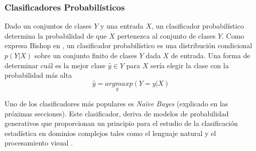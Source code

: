 \subsubsection{Clasificadores Probabilísticos}

	Dado un conjuntos de clases $Y$ y una entrada $X$, un clasificador probabilístico determina la probabilidad de que $X$ pertenezca al conjunto de clases $Y$. Como expresa Bishop en \cite{Bis07}, un clasificador probabilístico es una distribución condicional $p(Y|X)$ sobre un conjunto finito de clases $Y$ dada $X$ de entrada. Una forma de determinar cuál es la mejor clase $\hat{y} \in Y$ para $X$ sería elegir la clase con la probabilidad más alta
	$$\hat{y} = \underset{y}{argmax}p(Y=y|X) $$
	
	Uno de los clasificadores más populares es \textit{Na\"{i}ve Bayes} (explicado en las próximas secciones). Este clasificador, deriva de modelos de probabilidad generativos que proporcionan un principio para el estudio de la clasificación estadística en dominios complejos tales como el lenguaje natural y el procesamiento visual \cite{GargRo01}.

